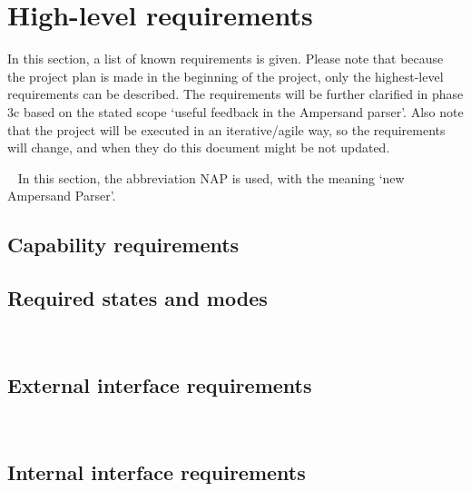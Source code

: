 \section{High-level requirements}
\label{sec:requirements}
In this section, a list of known requirements is given.
Please note that because the project plan is made in the beginning of the project, only the highest-level requirements can be described.
The requirements will be further clarified in phase 3c based on the stated scope `useful feedback in the Ampersand parser'.
Also note that the project will be executed in an iterative/agile way, so the requirements will change, and when they do this document might be not updated.

~\newline\noindent
In this section, the abbreviation NAP is used, with the meaning `new Ampersand Parser'.
%

\subsection{Capability requirements}

\subsection{Required states and modes}
\\


\subsection{External interface requirements}
\\


\subsection{Internal interface requirements}

